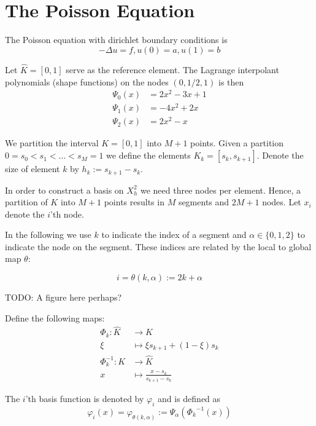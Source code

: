 \section{The Poisson Equation}

The Poisson equation with dirichlet boundary conditions is
\begin{equation}
    - \Delta u = f, u(0) = a, u(1) = b
\end{equation}

Let \( \hat{K} = [0, 1] \) serve as the reference element.
The Lagrange interpolant polynomials (shape functions)
on the nodes \( (0, 1/2, 1) \) is
then
\begin{align}
  \Psi_0(x) &= 2x^2 - 3x + 1\\
  \Psi_1(x) &= -4x^2 + 2x\\
  \Psi_2(x) &= 2x^2 - x
\end{align}

We partition the interval \( K = [0, 1] \) into \( M + 1 \) points.
Given a partition \( 0 = s_0 < s_1 < \dots < s_M = 1  \)
we define the elements \( K_k = [s_{k}, s_{k+1}] \).
Denote the size of element \( k \) by \( h_k := s_{k+1} - s_{k} \).

In order to construct a basis on \( X_h^2 \) we need three
nodes per element.
Hence, a partition of \( K \) into \( M + 1 \) points
results in \( M \) segments and \( 2M + 1 \) nodes.
Let \( x_i \) denote the \( i \)'th node.

In the following we use \( k \) to indicate the index
of a segment and \( \alpha \in \{  0, 1, 2  \} \) to indicate
the node on the segment. These indices are related by the
local to global map \( \theta \):

\begin{equation}
  i = \theta(k, \alpha) := 2k + \alpha    
\end{equation}

TODO: A figure here perhaps?

Define the following maps:
\begin{align}
  \Phi_k : \hat{K} &\longrightarrow  K \\
  \xi & \longmapsto \xi s_{k+1} + (1-\xi) s_{k} \\
  \Phi_k^{-1} : K &\longrightarrow  \hat{K} \\
  x & \longmapsto \frac{x - s_k}{s_{k+1} - s_k}
\end{align}

The \( i \)'th basis function is denoted by \( \varphi_i \)
and is defined as
\begin{equation}
  \varphi_i(x) = \varphi_{\theta(k, \alpha)} := \Psi_{\alpha}({{\Phi_k}^{-1}(x) })
\end{equation}

